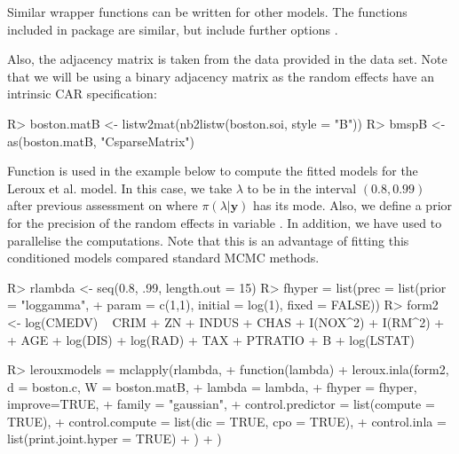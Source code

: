 \documentclass[article]{jss}
\begin{document}
Similar wrapper functions can be written for other models. The functions
included in package  are similar, but include further options
\citep[see,][for details]{Bivandetal:2013}.



Also, the adjacency matrix is taken from the data provided in the 
data set.
Note that we will be using a binary adjacency matrix as the random
effects have an intrinsic CAR specification:
\begin{Schunk}
\begin{Sinput}
R> boston.matB <- listw2mat(nb2listw(boston.soi, style = "B"))
R> bmspB <- as(boston.matB, "CsparseMatrix")
\end{Sinput}
\end{Schunk}

Function  is used in the example below to compute the fitted
models for the Leroux et al. model.  In this case, we take $\lambda$ to be in
the interval $(0.8,0.99)$ after previous assessment on where
$\pi(\lambda|\mathbf{y})$ has its mode. Also, we define a prior for the
precision of the random effects in variable .  In addition, we
have used  to parallelise the computations. Note that this is an
advantage of fitting this conditioned models compared standard MCMC methods.

\begin{Schunk}
\begin{Sinput}
R> rlambda <- seq(0.8, .99, length.out = 15)
R> fhyper = list(prec = list(prior = "loggamma", 
+     param = c(1,1), initial = log(1), fixed = FALSE))
R> form2 <- log(CMEDV) ~ CRIM + ZN + INDUS + CHAS + I(NOX^2) + I(RM^2) + 
+      AGE + log(DIS) + log(RAD) + TAX + PTRATIO + B + log(LSTAT)
\end{Sinput}
\end{Schunk}

\begin{Schunk}
\begin{Sinput}
R> lerouxmodels = mclapply(rlambda,
+          function(lambda) {
+                  leroux.inla(form2, d = boston.c, W = boston.matB, 
+  			lambda = lambda,
+                          fhyper = fhyper, improve=TRUE,
+                          family = "gaussian",
+                          control.predictor = list(compute = TRUE),
+                          control.compute = list(dic = TRUE, cpo = TRUE),
+                          control.inla = list(print.joint.hyper = TRUE)
+                  )
+          })
\end{Sinput}
\end{Schunk}
\end{document}
